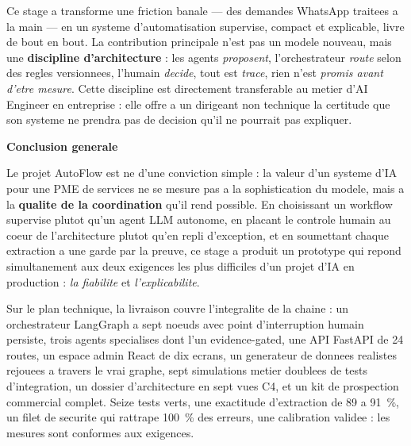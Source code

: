 \documentclass[12pt,a4paper,openany]{report}
\begin{document}
Ce stage a transforme une friction banale --- des demandes WhatsApp traitees a la main --- en un systeme d'automatisation supervise, compact et explicable, livre de bout en bout. La contribution principale n'est pas un modele nouveau, mais une \textbf{discipline d'architecture} : les agents \emph{proposent}, l'orchestrateur \emph{route} selon des regles versionnees, l'humain \emph{decide}, tout est \emph{trace}, rien n'est \emph{promis avant d'etre mesure}. Cette discipline est directement transferable au metier d'AI Engineer en entreprise : elle offre a un dirigeant non technique la certitude que son systeme ne prendra pas de decision qu'il ne pourrait pas expliquer.

\cleardoublepage
{}

\vspace*{1cm}
{\noindent \Huge \bfseries \color{titleBlue} Conclusion generale \par}
\vspace{1.2cm}

Le projet AutoFlow est ne d'une conviction simple : la valeur d'un systeme d'IA pour une PME de services ne se mesure pas a la sophistication du modele, mais a la \textbf{qualite de la coordination} qu'il rend possible. En choisissant un workflow supervise plutot qu'un agent LLM autonome, en placant le controle humain au coeur de l'architecture plutot qu'en repli d'exception, et en soumettant chaque extraction a une garde par la preuve, ce stage a produit un prototype qui repond simultanement aux deux exigences les plus difficiles d'un projet d'IA en production : \emph{la fiabilite} et \emph{l'explicabilite}.

Sur le plan technique, la livraison couvre l'integralite de la chaine : un orchestrateur LangGraph a sept noeuds avec point d'interruption humain persiste, trois agents specialises dont l'un evidence-gated, une API FastAPI de 24 routes, un espace admin React de dix ecrans, un generateur de donnees realistes rejouees a travers le vrai graphe, sept simulations metier doublees de tests d'integration, un dossier d'architecture en sept vues C4, et un kit de prospection commercial complet. Seize tests verts, une exactitude d'extraction de 89 a 91~\%, un filet de securite qui rattrape 100~\% des erreurs, une calibration validee : les mesures sont conformes aux exigences.
\end{document}
